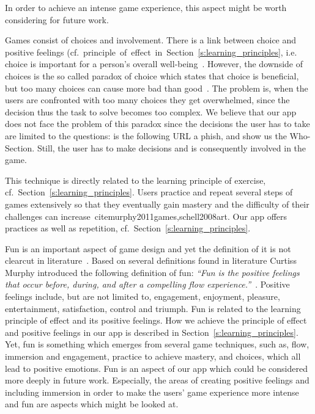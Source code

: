 \begin{description}[leftmargin=0cm]
In order to achieve an intense game experience, this aspect might be worth considering for future work.
	\item[Choice and Involvement]
Games consist of choices and involvement. 
There is a link between choice and positive feelings (cf.~principle~of~effect~in~Section~\ref{s:learning_principles}, i.e. choice is important for a person's overall well-being~\cite{seligman2012flourish, schwartz2009paradox}.
However, the downside of choices is the so called paradox of choice which states that choice is beneficial, but too many choices can cause more bad than good~\cite{schwartz2009paradox}.
The problem is, when the users are confronted with too many choices they get overwhelmed, since the decision thus the task to solve becomes too complex.
We believe that our app does not face the problem of this paradox since the decisions the user has to take are limited to the questions:
is the following URL a phish, and show us the Who-Section.
Still, the user has to make decisions and is consequently involved in the game.
	\item[Practice] This technique is directly related to the learning principle of exercise, cf.~Section~\ref{s:learning_principles}. 
Users practice and repeat several steps of games extensively so that they eventually gain mastery and the difficulty of their challenges can increase~cite{murphy2011games,schell2008art}. 
Our app offers practices as well as repetition, cf.~Section~\ref{s:learning_principles}.
	\item[Fun] Fun is an important aspect of game design and yet the definition of it is not clearcut in literature~\cite{murphy2011games, schell2008art,koster2010theory}.
Based on several definitions found in literature Curtiss Murphy introduced the following definition of fun: \textit{``Fun is the positive feelings that occur before, during, and after a compelling flow experience.''}~\cite{murphy2011games}.
Positive feelings include, but are not limited to, engagement, enjoyment, pleasure, entertainment, satisfaction, control and triumph. 
Fun is related to the learning principle of effect and its positive feelings.
How we achieve the principle of effect and positive feelings in our app is described in Section~\ref{s:learning_principles}.
Yet, fun is something which emerges from several game techniques, such as, flow, immersion and engagement, practice to achieve mastery, and choices, which all lead to positive emotions.
Fun is an aspect of our app which could be considered more deeply in future work. 
Especially, the areas of creating positive feelings and including immersion in order to make the users' game experience more intense and fun are aspects which might be looked at.
\end{description}

